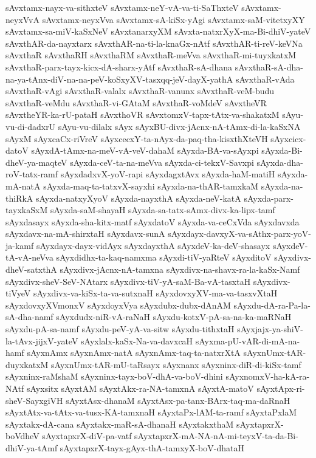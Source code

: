 {sAvxtamx-nayx-va-sithxteV
sAvxtamx-neY-vA-va-ti-SaThxteV
sAvxtamx-neyxVvA
sAvxtamx-neyxVva
sAvxtamx-sA-kiSx-yAgi
sAvxtamx-saM-vitetxyXY
sAvxtamx-sa-miV-kaSxNeV
sAvxtanarxyXM
sAvxta-natxrXyX-ma-Bi-dhiV-yateV
sAvxthAR-da-nayxtarx
sAvxthAR-na-ti-la-knaGx-nAtf
sAvxthAR-ti-reV-keVNa
sAvxthaR
sAvxthaRH
sAvxthaRM
sAvxthaR-meVva
sAvxthaR-mi-tuyxkatxM
sAvxthaR-parx-tayx-kicx-dA-sharx-yAtf
sAvxthaR-sA-dhana
sAvxthaR-sA-dha-na-ya-tAnx-diV-na-na-peV-koSxyXV-tasxqq-jeV-dayX-yathA
sAvxthaR-vAda
sAvxthaR-vAgi
sAvxthaR-valalx
sAvxthaR-vanunx
sAvxthaR-veM-budu
sAvxthaR-veMdu
sAvxthaR-vi-GAtaM
sAvxthaR-voMdeV
sAvxtheVR
sAvxtheYR-ka-rU-pataH
sAvxthoVR
sAvxtomxV-tapx-tAtx-va-shakatxM
sAyu-vu-di-dadxrU
sAyu-vu-dilalx
sAyx
sAyxBU-divx-jAcnx-nA-tAmx-di-la-kaSxNA
sAyxM
sAyxcaCx-riVreV
sAyxcecxY-ta-nAyx-da-paq-tha-kisxthXteVH
sAyxcicx-datoV
sAyxdA-tAmx-na-meV-vA-veV-dahaM
sAyxda-BA-va-sAyxpi
sAyxda-Bi-dheV-ya-maqteV
sAyxda-ceV-ta-na-meVva
sAyxda-ci-tekxV-Savxpi
sAyxda-dha-roV-tatx-ramf
sAyxdadxvX-yoV-rapi
sAyxdagxtAvx
sAyxda-haM-matiH
sAyxda-mA-natA
sAyxda-maq-ta-tatxvX-sayxhi
sAyxda-na-thAR-tamxkaM
sAyxda-na-thiRkA
sAyxda-natxyXyoV
sAyxda-nayxthA
sAyxda-neV-katA
sAyxda-parx-tayxkaSxM
sAyxda-saM-shayaH
sAyxda-sa-tatx-sAmx-divx-ka-lipx-tamf
sAyxdasayx
sAyxda-sha-kitx-matf
sAyxdatoV
sAyxda-va-ceCxVda
sAyxdavxda
sAyxdavx-na-mA-shirxtaH
sAyxdavx-sunA
sAyxdayx-davxyX-va-sAthx-parx-yoV-ja-kamf
sAyxdayx-dayx-vidAyx
sAyxdayxthA
sAyxdeV-ka-deV-shasayx
sAyxdeV-tA-vA-neVva
sAyxdidhx-ta-kaq-namxma
sAyxdi-tiV-yaRteV
sAyxditoV
sAyxdivx-dheV-satxthA
sAyxdivx-jAcnx-nA-tamxna
sAyxdivx-na-shavx-ra-la-kaSx-Namf
sAyxdivx-sheV-SeV-NAtarx
sAyxdivx-tiV-yA-saM-Ba-vA-tasxtaH
sAyxdivx-tiVyeV
sAyxdivx-va-kiSx-ta-va-sutxnaH
sAyxdovxyXV-ma-va-tasxvXtaH
sAyxdovxyXVmonxV
sAyxdoyxVya
sAyxdubx-dubx-dAnAM
sAyxdu-dA-ra-Pa-la-sA-dha-namf
sAyxdudx-niR-vA-raNaH
sAyxdu-kotxV-pA-sa-na-ka-maRNaH
sAyxdu-pA-sa-namf
sAyxdu-peV-yA-va-sitw
sAyxdu-tithxtaH
sAyxjajx-ya-shiV-la-tAvx-jijxV-yateV
sAyxlalx-kaSx-Na-va-davxcaH
sAyxma-pU-vAR-di-mA-na-hamf
sAyxnAmx
sAyxnAmx-natA
sAyxnAmx-taq-ta-natxrXtA
sAyxnUmx-tAR-duyxkatxM
sAyxnUmx-tAR-mU-taRsayx
sAyxnanx
sAyxninx-diR-di-kiSx-tamf
sAyxninx-raMshaM
sAyxninx-tayx-boV-dhA-va-boV-dhini
sAyxnomxV-ha-kA-ra-NAtf
sAyxsitx
sAyxtAM
sAyxtAkx-ra-NA-tamxnA
sAyxtA-matoV
sAyxtApx-ri-sheV-SayxgiVH
sAyxtAsx-dhanaM
sAyxtAsx-pa-tanx-BArx-taq-ma-daRnaH
sAyxtAtx-va-tAtx-va-tusx-KA-tamxnaH
sAyxtaPx-lAM-ta-ramf
sAyxtaPxlaM
sAyxtakx-dA-cana
sAyxtakx-maR-sA-dhanaH
sAyxtakxthaM
sAyxtapxrX-boVdheV
sAyxtapxrX-diV-pa-vatf
sAyxtapxrX-mA-NA-nA-mi-teyxV-ta-da-Bi-dhiV-ya-tAmf
sAyxtapxrX-tayx-gAyx-thA-tamxyX-boV-dhataH
}
